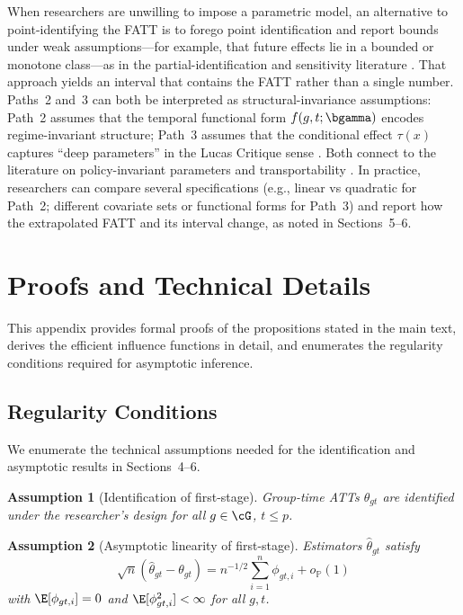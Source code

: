 \documentclass{article}
\newtheorem{assumption}{Assumption}
\renewcommand{\P}{\mathbb{P}}
\begin{document}
When researchers are unwilling to impose a parametric model, an alternative to point-identifying the FATT is to forego point identification and report bounds under weak assumptions---for example, that future effects lie in a bounded or monotone class---as in the partial-identification and sensitivity literature \citep{manskiPublicPolicyUncertain2013}. That approach yields an interval that contains the FATT rather than a single number. Paths~2 and~3 can both be interpreted as structural-invariance assumptions: Path~2 assumes that the temporal functional form $f(g,t;\bgamma)$ encodes regime-invariant structure; Path~3 assumes that the conditional effect $\tau(x)$ captures ``deep parameters'' in the Lucas Critique sense \citep{lucasjrEconometricPolicyEvaluation1976}. Both connect to the literature on policy-invariant parameters and transportability \citep{heckmanStructuralEquationsTreatment2005,pearlExternalValidityCalculus2022}. In practice, researchers can compare several specifications (e.g., linear vs quadratic for Path~2; different covariate sets or functional forms for Path~3) and report how the extrapolated FATT and its interval change, as noted in Sections~5--6.

\appendix

\section{Proofs and Technical Details}

This appendix provides formal proofs of the propositions stated in the main text, derives the efficient influence functions in detail, and enumerates the regularity conditions required for asymptotic inference.

\subsection{Regularity Conditions}\label{app:regularity}

We enumerate the technical assumptions needed for the identification and asymptotic results in Sections~4--6.

\begin{assumption}[Identification of first-stage]\label{RC1}
Group-time ATTs $\theta_{gt}$ are identified under the researcher's design for all $g \in \cG$, $t \leq p$.
\end{assumption}

\begin{assumption}[Asymptotic linearity of first-stage]\label{RC2}
Estimators $\widehat{\theta}_{gt}$ satisfy
\[
\sqrt{n}(\widehat{\theta}_{gt} - \theta_{gt}) = n^{-1/2}\sum_{i=1}^n \phi_{gt,i} + o_{\P}(1)
\]
with $\E[\phi_{gt,i}] = 0$ and $\E[\phi_{gt,i}^2] < \infty$ for all $g,t$.
\end{assumption}
\end{document}
